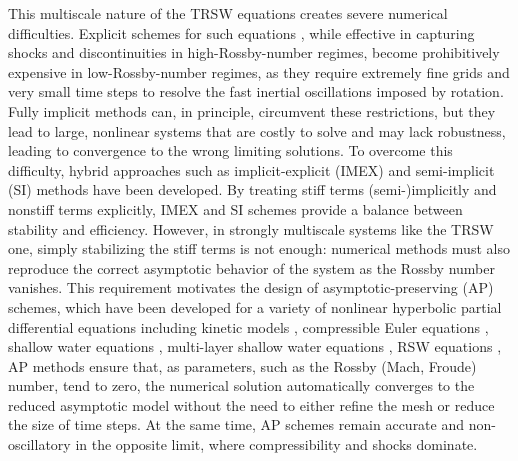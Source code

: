 \documentclass[a4paper,11pt,twoside]{article}
\numberwithin{equation}{section}
\numberwithin{figure}{section}
\numberwithin{table}{section}
\begin{document}
This multiscale nature of the TRSW equations creates severe numerical difficulties. Explicit schemes  for such equations
\cite{Eldred_2019,Kurganov_2020,Kurganov_2021,Ricardo_2024,Tambyah_2025}, while effective in capturing shocks and discontinuities in
high-Rossby-number regimes, become prohibitively expensive in low-Rossby-number regimes, as they require extremely fine grids and very small
time steps to resolve the fast inertial oscillations imposed by rotation. Fully implicit methods can, in principle, circumvent these
restrictions, but they lead to large, nonlinear systems that are costly to solve and may lack robustness, leading to convergence to the
wrong limiting solutions. To overcome this difficulty, hybrid approaches such as implicit-explicit (IMEX)
\cite{Ascher_1997,Boscarino_2013,Boscarino_2018,Hu_2025,Kennedy_2003} and semi-implicit (SI)
\cite{Boscarino_2016,Boscarino_2022,Chertock_2015} methods have been developed. By treating stiff terms (semi-)implicitly and nonstiff terms
explicitly, IMEX and SI schemes provide a balance between stability and efficiency. However, in strongly multiscale systems like the TRSW
one, simply stabilizing the stiff terms is not enough: numerical methods must also reproduce the correct asymptotic behavior of the system
as the Rossby number vanishes. This requirement motivates the design of asymptotic-preserving (AP) schemes, which have been developed for a
variety of nonlinear hyperbolic partial differential equations including kinetic models 
\cite{Jin_1999,Filbet_2010,Dimarco_2013,Hu_2017,Abgrall_2020,Klar_1999,Zhang_2023,Anandan_2024}, compressible Euler equations 
\cite{Allegrini_2025,Boscarino_2019,Boscarino_2022,Boscheri_2020,CKKM, Degond_2007,Dimarco_2017,Haack_2012,Huang_2025,Klein_1995,Zeifang_2020},
shallow water equations \cite{Bispen_2014,Busto_2022,Huang_2022,Huang_2024,Liu_2020,Vater_2018,Xie_2024}, multi-layer shallow water
equations \cite{Couderc_2017,Duran_2017}, RSW equations \cite{Kurganov_2022,Liu_2019,Xie_2025,Zakerzadeh_2017,Zhang_2026}, AP methods
ensure that, as parameters, such as the Rossby (Mach, Froude) number, tend to zero, the numerical solution automatically converges to the
reduced asymptotic model without the need to either refine the mesh or reduce the size of time steps. At the same time, AP schemes remain
accurate and non-oscillatory in the opposite limit, where compressibility and shocks dominate.
\end{document}
